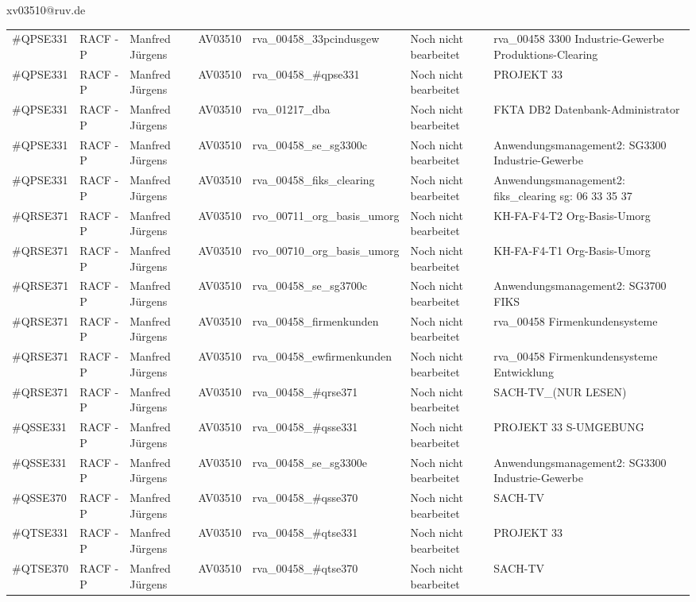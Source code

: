 \documentclass[a4paper,landscape,12pt]{letter}
\begin{document}
\begin{letter}{xv03510@ruv.de\hfill \break}
\begin{tiny}
\begin{longtable}{|p{35mm}|p{15mm}|p{25mm}|p{10mm}|p{40mm}|p{50mm}|p{50mm}|}
\#QPSE331 & RACF - P & Manfred Jürgens & AV03510 & rva\_00458\_33pcindusgew & Noch nicht bearbeitet & rva\_00458 3300 Industrie-Gewerbe Produktions-Clearing \\
\#QPSE331 & RACF - P & Manfred Jürgens & AV03510 & rva\_00458\_\#qpse331 & Noch nicht bearbeitet & PROJEKT 33 \\
\#QPSE331 & RACF - P & Manfred Jürgens & AV03510 & rva\_01217\_dba & Noch nicht bearbeitet & FKTA DB2 Datenbank-Administrator \\
\#QPSE331 & RACF - P & Manfred Jürgens & AV03510 & rva\_00458\_se\_sg3300c & Noch nicht bearbeitet & Anwendungsmanagement2: SG3300 Industrie-Gewerbe \\
\#QPSE331 & RACF - P & Manfred Jürgens & AV03510 & rva\_00458\_fiks\_clearing & Noch nicht bearbeitet & Anwendungsmanagement2: fiks\_clearing sg: 06 33 35 37 \\
\#QRSE371 & RACF - P & Manfred Jürgens & AV03510 & rvo\_00711\_org\_basis\_umorg & Noch nicht bearbeitet & KH-FA-F4-T2 Org-Basis-Umorg \\
\#QRSE371 & RACF - P & Manfred Jürgens & AV03510 & rvo\_00710\_org\_basis\_umorg & Noch nicht bearbeitet & KH-FA-F4-T1 Org-Basis-Umorg \\
\#QRSE371 & RACF - P & Manfred Jürgens & AV03510 & rva\_00458\_se\_sg3700c & Noch nicht bearbeitet & Anwendungsmanagement2: SG3700 FIKS \\
\#QRSE371 & RACF - P & Manfred Jürgens & AV03510 & rva\_00458\_firmenkunden & Noch nicht bearbeitet & rva\_00458 Firmenkundensysteme \\
\#QRSE371 & RACF - P & Manfred Jürgens & AV03510 & rva\_00458\_ewfirmenkunden & Noch nicht bearbeitet & rva\_00458 Firmenkundensysteme Entwicklung \\
\#QRSE371 & RACF - P & Manfred Jürgens & AV03510 & rva\_00458\_\#qrse371 & Noch nicht bearbeitet & SACH-TV\_(NUR LESEN) \\
\#QSSE331 & RACF - P & Manfred Jürgens & AV03510 & rva\_00458\_\#qsse331 & Noch nicht bearbeitet & PROJEKT 33 S-UMGEBUNG \\
\#QSSE331 & RACF - P & Manfred Jürgens & AV03510 & rva\_00458\_se\_sg3300e & Noch nicht bearbeitet & Anwendungsmanagement2: SG3300 Industrie-Gewerbe \\
\#QSSE370 & RACF - P & Manfred Jürgens & AV03510 & rva\_00458\_\#qsse370 & Noch nicht bearbeitet & SACH-TV \\
\#QTSE331 & RACF - P & Manfred Jürgens & AV03510 & rva\_00458\_\#qtse331 & Noch nicht bearbeitet & PROJEKT 33 \\
\#QTSE370 & RACF - P & Manfred Jürgens & AV03510 & rva\_00458\_\#qtse370 & Noch nicht bearbeitet & SACH-TV \\


\end{longtable}
\end{tiny}
\end{letter}
\end{document}
